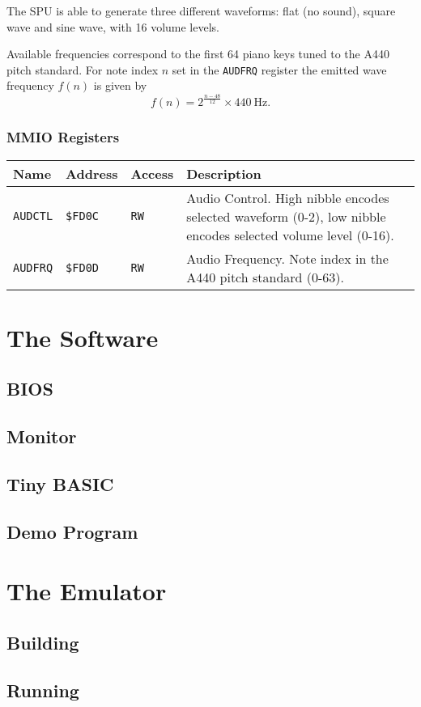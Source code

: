\documentclass[a4paper,10pt,oneside]{article}
\begin{document}
The SPU is able to generate three different waveforms: flat (no sound), square wave and sine wave, with 16 volume levels.

Available frequencies correspond to the first 64 piano keys tuned to the A440 pitch standard. For note index $n$ set in the \texttt{AUDFRQ} register the emitted wave frequency $f(n)$ is given by
\begin{equation*}
  f(n) = 2^{\frac{n-48}{12}} \times \SI{440}{\hertz}.
\end{equation*}

\subsubsection*{MMIO Registers}
\begin{tabularx}{\textwidth}{l | l | l | X }
  \textbf{Name} & \textbf{Address} & \textbf{Access} & \textbf{Description} \\ \hline
  \texttt{AUDCTL} & \texttt{\$FD0C} & \texttt{RW} &
  Audio Control. High nibble encodes selected waveform (0-2), low nibble encodes selected volume level (0-16). \\ \hline
  \texttt{AUDFRQ} & \texttt{\$FD0D} & \texttt{RW} &
  Audio Frequency. Note index in the A440 pitch standard (0-63). \\
\end{tabularx}

\section{The Software}
\subsection{BIOS}
\subsection{Monitor}
\subsection{Tiny BASIC}
\subsection{Demo Program}

\section{The Emulator}
\subsection{Building}
\subsection{Running}
\end{document}
